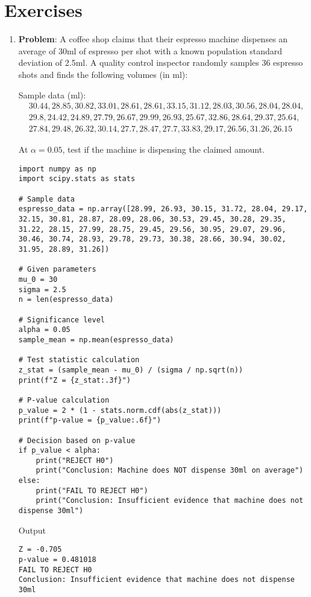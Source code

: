\section{Exercises}
\begin{enumerate}
    \item \textbf{Problem}: A coffee shop claims that their espresso machine dispenses an average of 30ml of espresso
    per shot with a known population standard deviation of 2.5ml. A quality control inspector
    randomly samples 36 espresso shots and finds the following volumes (in ml):

    Sample data (ml):
    \begin{align*}
    &30.44, 28.85, 30.82, 33.01, 28.61, 28.61, 33.15, 31.12, 28.03, 30.56, 28.04, 28.04,\\
    &29.8,  24.42, 24.89, 27.79, 26.67, 29.99, 26.93, 25.67, 32.86, 28.64, 29.37, 25.64,\\
    &27.84, 29.48, 26.32, 30.14, 27.7,  28.47, 27.7, 33.83, 29.17, 26.56, 31.26, 26.15
    \end{align*}

    At $ \alpha = 0.05 $, test if the machine is dispensing the claimed amount.

    \begin{lstlisting}
import numpy as np
import scipy.stats as stats

# Sample data
espresso_data = np.array([28.99, 26.93, 30.15, 31.72, 28.04, 29.17, 32.15, 30.81, 28.87, 28.09, 28.06, 30.53, 29.45, 30.28, 29.35, 31.22, 28.15, 27.99, 28.75, 29.45, 29.56, 30.95, 29.07, 29.96, 30.46, 30.74, 28.93, 29.78, 29.73, 30.38, 28.66, 30.94, 30.02, 31.95, 28.89, 31.26])

# Given parameters
mu_0 = 30
sigma = 2.5
n = len(espresso_data)

# Significance level
alpha = 0.05
sample_mean = np.mean(espresso_data)

# Test statistic calculation
z_stat = (sample_mean - mu_0) / (sigma / np.sqrt(n))
print(f"Z = {z_stat:.3f}")

# P-value calculation
p_value = 2 * (1 - stats.norm.cdf(abs(z_stat)))
print(f"p-value = {p_value:.6f}")

# Decision based on p-value
if p_value < alpha:
    print("REJECT H0")
    print("Conclusion: Machine does NOT dispense 30ml on average")
else:
    print("FAIL TO REJECT H0")
    print("Conclusion: Insufficient evidence that machine does not dispense 30ml")
    \end{lstlisting}
    Output
    \begin{lstlisting}
Z = -0.705
p-value = 0.481018
FAIL TO REJECT H0
Conclusion: Insufficient evidence that machine does not dispense 30ml
    \end{lstlisting}


\end{enumerate}
